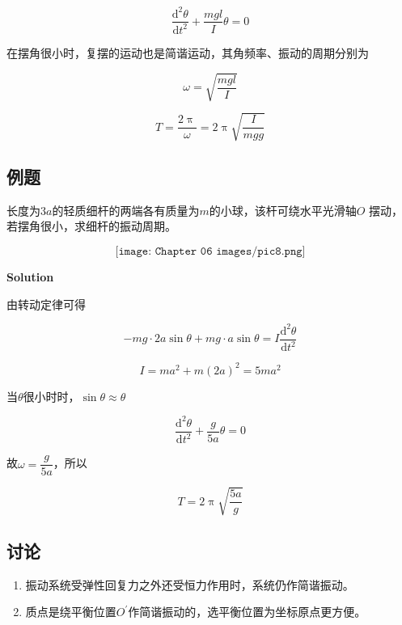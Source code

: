 \documentclass[
	12pt, %
	a4paper, %
]{myLegrandOrangeBook}
\newcommand{\rmd}{\mathrm{d}}
\begin{document}
    \begin{equation}
        \frac{\rmd^2 \theta}{\rmd t^2} + \frac{mgl}{I}\theta = 0
    \end{equation}

    在摆角很小时，复摆的运动也是简谐运动，其角频率、振动的周期分别为

    \begin{equation}
        \omega = \sqrt{\frac{mgl}{I}}
    \end{equation}

    \begin{equation}
        T = \frac{2 \uppi}{\omega} = 2 \uppi \sqrt{\frac{I}{mgg}}
    \end{equation}

\subsection{例题}

\begin{exercise}
    长度为\(3a\)的轻质细杆的两端各有质量为\(m\)的小球，该杆可绕水平光滑轴\(O\)
    摆动，若摆角很小，求细杆的振动周期。

    \[
        \texttt{[image: Chapter 06 images/pic8.png]}
    \]
\end{exercise}

    \vspace{1em}

    \textbf{Solution}
    \vspace{1em}

    由转动定律可得

    \[
        -mg \cdot 2a \sin \theta + mg \cdot a \sin \theta = I \frac{\rmd^2 \theta}{\rmd t^2}
    \]

    \[
        I = ma^2 + m\left(2a\right)^2 = 5 ma^2
    \]

    当\(\theta\)很小时时，\(\sin \theta \approx \theta\)

    \[
        \frac{\rmd^2 \theta}{\rmd t^2} + \frac{g}{5a}\theta =0
    \]

    故\(\omega = \dfrac{g}{5a}\)，所以

    \[
        T = 2\uppi \sqrt{\frac{5a}{g}}
    \]

\subsection{讨论}

    \begin{enumerate}
        \item 振动系统受弹性回复力之外还受恒力作用时，系统仍作简谐振动。
        \item 质点是绕平衡位置\(O^{\prime}\)作简谐振动的，选平衡位置为坐标原点更方便。
    \end{enumerate}
\end{document}
